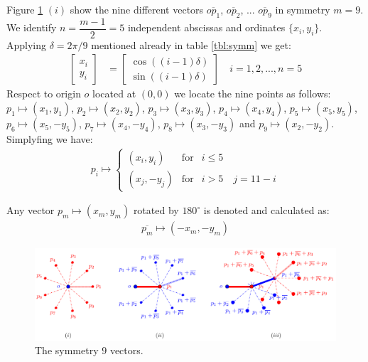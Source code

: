 \documentclass[11pt]{article}
\begin{document}
Figure \ref{fig:vectors-a} $(i)$ show the nine different vectors $\overline{op_1}$, $\overline{op_2}$, ... $\overline{op_9}$ in symmetry $m=9$. We identify $n = \dfrac{m-1}2 = 5$ independent abscissas and ordinates $\{ x_i, y_i \}$. Applying $\delta = 2\pi/9$ mentioned already in table \ref{tbl:symm} we get:
\begin{align}
\left[ \begin{array}{c} x_i \\ y_i \end{array} \right] &= 
\left[ \begin{array}{c} \cos((i-1)\delta) \\ \sin((i-1)\delta) \end{array} \right]
 \quad i = 1,2,...,n=5
\end{align}
Respect to origin $o$ located at $(0,0)$ we locate the nine points as follows:
$p_1 \mapsto (x_1,y_1)$,
$p_2 \mapsto (x_2,y_2)$,
$p_3 \mapsto (x_3,y_3)$,
$p_4 \mapsto (x_4,y_4)$,
$p_5 \mapsto (x_5,y_5)$,
$p_6 \mapsto (x_5,-y_5)$,
$p_7 \mapsto (x_4,-y_4)$,
$p_8 \mapsto (x_3,-y_3)$ and
$p_9 \mapsto (x_2,-y_2)$. Simplyfing we have:
\begin{align}
p_i \mapsto \left\{ \begin{array}{ccl}
 (x_i,y_i) & \mbox{for} & i \leq 5 \\
 (x_j, -y_j) & \mbox{for} & i > 5 \quad j = 11-i
 \end{array}\right.
\end{align}

Any vector $p_m \mapsto (x_m, y_m)$ rotated by $180^\circ$ is denoted and calculated as:
\begin{align}
\overline{p_m} \mapsto (-x_m, -y_m)
\end{align}

\begin{figure}[H]
\centering
\includegraphics[scale=1]{vectors-a}
\caption{The symmetry $9$ vectors.}
\label{fig:vectors-a}
\end{figure}
\end{document}
